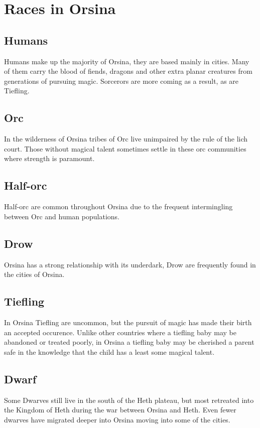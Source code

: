 \documentclass[10pt,twoside,twocolumn,openany,justified,bg=full,nomultitoc]{dndbook}
\begin{document}
\section{Races in Orsina}
\label{sec-3-3}
\subsection{Humans}
\label{sec-3-3-1}
Humans make up the majority of Orsina, they are based mainly in cities. Many of them carry the blood of fiends, dragons and other extra planar creatures from generations of pursuing magic. Sorcerors are more coming as a result, as are Tiefling.

\subsection{Orc}
\label{sec-3-3-2}
In the wilderness of Orsina tribes of Orc live unimpaired by the rule of the lich court. Those without magical talent sometimes settle in these orc communities where strength is paramount.

\subsection{Half-orc}
\label{sec-3-3-3}
Half-orc are common throughout Orsina due to the frequent intermingling between Orc and human populations. 

\subsection{Drow}
\label{sec-3-3-4}
Orsina has a strong relationship with its underdark, Drow are frequently found in the cities of Orsina.

\subsection{Tiefling}
\label{sec-3-3-5}
In Orsina Tiefling are uncommon, but the pursuit of magic has made their birth an accepted occurence. Unlike other countries where a tiefling baby may be abandoned or treated poorly, in Orsina a tiefling baby may be cherished a parent safe in the knowledge that the child has a least some magical talent.

\subsection{Dwarf}
\label{sec-3-3-6}
Some Dwarves still live in the south of the Heth plateau, but most retreated into the Kingdom of Heth during the war between Orsina and Heth. Even fewer dwarves have migrated deeper into Orsina moving into some of the cities. 
\end{document}
